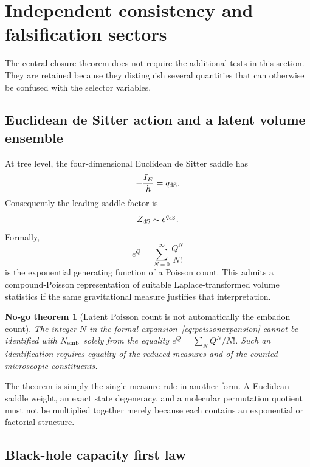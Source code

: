 \documentclass[aps,prd,preprint,nofootinbib,superscriptaddress]{revtex4-2}
\newtheorem{nogotheorem}[theorem]{No-go theorem}
\theoremstyle{definition}
\theoremstyle{remark}
\begin{document}
\section{Independent consistency and falsification sectors}
\label{sec:consistency}

The central closure theorem does not require the additional tests in this
section.  They are retained because they distinguish several quantities that
can otherwise be confused with the selector variables.

\subsection{Euclidean de Sitter action and a latent volume ensemble}

At tree level, the four-dimensional Euclidean de Sitter saddle has
\begin{equation}
-\frac{I_E}{\hbar}=q_{\rm dS}.
\end{equation}
Consequently the leading saddle factor is
\begin{equation}
Z_{\rm dS}\sim e^{q_{\rm dS}}.
\label{eq:dsweight}
\end{equation}
Formally,
\begin{equation}
e^{Q}
=
\sum_{N=0}^{\infty}\frac{Q^N}{N!}
\label{eq:poissonexpansion}
\end{equation}
is the exponential generating function of a Poisson count.  This admits a
compound-Poisson representation of suitable Laplace-transformed volume
statistics if the same gravitational measure justifies that interpretation.

\begin{nogotheorem}[Latent Poisson count is not automatically the embadon count]
\label{thm:latentcount}
The integer $N$ in the formal expansion~\eqref{eq:poissonexpansion} cannot be
identified with $N_{\rm emb}$ solely from the equality
$e^Q=\sum_NQ^N/N!$.  Such an identification requires equality of the reduced
measures and of the counted microscopic constituents.
\end{nogotheorem}

The theorem is simply the single-measure rule in another form.  A Euclidean
saddle weight, an exact state degeneracy, and a molecular permutation quotient
must not be multiplied together merely because each contains an exponential
or factorial structure.

\subsection{Black-hole capacity first law}
\end{document}
